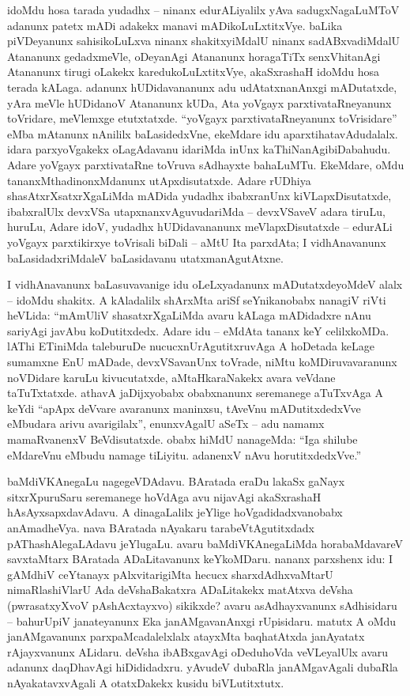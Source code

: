 idoMdu hosa tarada yudadhx -- ninanx edurALiyalilx yAva sadugxNa\-gaLuMToV adanunx patetx mADi adakekx manavi mADikoLuLxtitxVye. baLika piVDeyanunx sahisikoLuLxva ninanx shakitxyiMdalU ninanx sadABxvadiMdalU Atananunx gedadxmeVle, oDeyanAgi Atananunx horagaTiTx senxVhitanAgi Atananunx tirugi oLakekx karedukoLuLxtitxVye, akaSxrashaH idoMdu hosa terada kALaga. adanunx hUDidavananunx adu udAtatxnanAnxgi mADutatxde, yAra meVle hUDidanoV Atananunx kUDa, Ata yoVgayx parxtivataRneyanunx toVridare, meVlemxge etutxtatxde. ``yoVgayx parxtivataRneyanunx toVrisidare'' eMba mAtanunx nAnililx baLasidedxVne, ekeMdare idu aparxtihatavAdudalalx. idara parxyoVgakekx oLagAdavanu idariMda inUnx kaThiNanAgibiDabahudu. Adare yoVgayx parxtivataRne toVruva sAdhayxte bahaLuMTu. EkeMdare, oMdu tananxMthadinonxMdanunx utApxdisutatxde. Adare rUDhiya shasAtxrXsatxrXgaLiMda mADida yudadhx ibabxranUnx kiVLapxDisutatxde, ibabxralUlx devxVSa utapxnanxvAguvudariMda -- devxVSaveV adara tiruLu, huruLu, Adare idoV, yudadhx hUDidavananunx meVlapxDisutatxde -- edurALi yoVgayx parxtikirxye toVrisali biDali -- aMtU Ita parxdAta; I vidhAnavanunx baLasidadxriMdaleV baLasidavanu utatxmanAgutAtxne.

I vidhAnavanunx baLasuvavanige idu oLeLxyadanunx mADutatxdeyoMdeV alalx -- idoMdu shakitx. A kAladalilx shArxMta ariSf seYnikanobabx nanagiV riVti heVLida: ``mAmUliV shasatxrXgaLiMda avaru kALaga mADidadxre nAnu sariyAgi javAbu koDutitxdedx. Adare idu -- eMdAta tananx keY celilxkoMDa. lAThi ETiniMda taleburuDe nucucxnUrAgutitxruvAga A hoDetada keLage sumamxne EnU mADade, devxVSavanUnx toVrade, niMtu koMDiruvavaranunx noVDidare karuLu kivucutatxde, aMtaHkaraNakekx avara veVdane taTuTxtatxde. athavA jaDijxyobabx obabxnanunx seremanege aTuTxvAga A keYdi ``apApx deVvare avaranunx maninxsu, tAveVnu mADutitxdedxVve eMbudara arivu avarigilalx'', enunxvAgalU aSeTx -- adu namamx mamaRvanenxV BeVdisutatxde. obabx hiMdU nanageMda: ``Iga shilube eMdareVnu eMbudu namage tiLiyitu. adanenxV nAvu horutitxdedxVve.''

baMdiVKAnegaLu nagegeVDAdavu. BAratada eraDu lakaSx gaNayx sitxrXpuruSaru seremanege hoVdAga avu nijavAgi akaSxrashaH hAsAyxsapxdavAdavu. A dinagaLalilx jeYlige hoVgadidadxvanobabx anAmadheVya. nava BAratada nAyakaru tarabeVtAgutitxdadx pAThashAlegaLAdavu jeYlugaLu. avaru baMdiVKAnegaLiMda horabaMdavareV savxtaMtarx BAratada ADaLitavanunx keYkoMDaru. nananx parxshenx idu: I gAMdhiV ceYtanayx pAlxvitarigiMta hecucx sharxdAdhxvaMtarU nimaRlashiVlarU Ada deVshaBakatxra ADaLitakekx matAtxva deVsha (pwrasatxyXvoV pAshAcxtayxvo) sikikxde? avaru asAdhayxvanunx sAdhisidaru -- bahurUpiV janateyanunx Eka janAMgavanAnxgi rUpisidaru. matutx A oMdu janAMgavanunx parxpaMcadalelxlalx atayxMta baqhatAtxda janAyatatx rAjayxvanunx ALidaru. deVsha ibABxgavAgi oDeduhoVda veVLeyalUlx avaru adanunx daqDhavAgi hiDididadxru. yAvudeV dubaRla janAMgavAgali dubaRla nAyakatavxvAgali A otatxDakekx kusidu biVLutitxtutx. 


